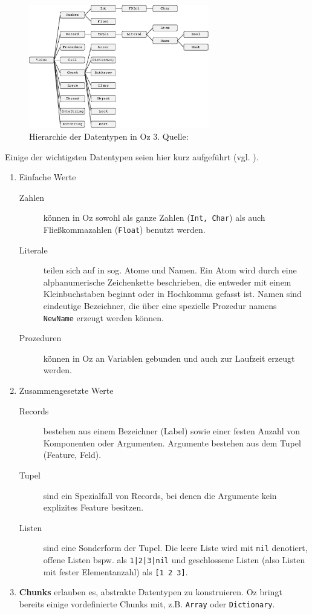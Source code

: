 \begin{figure}[hp]
  \centering \includegraphics[width=0.70\textwidth]{../images/oz-datentypen} 
  \caption{Hierarchie der Datentypen in Oz 3. Quelle:
  \cite[Tutorial of Oz, Chapter 3.1]{url:mozart-documentation}}
  \label{fig:oz-datentypen}
\end{figure}

Einige der wichtigsten Datentypen seien hier kurz aufgeführt (vgl. 
\cite{Brunklaus:00}).

\begin{enumerate}
  \item Einfache Werte
    \begin{description}
      \item [Zahlen] können in Oz sowohl als ganze Zahlen (\texttt{Int, Char})
      als auch Fließkommazahlen (\texttt{Float}) benutzt werden.
      \item[Literale] teilen sich auf in sog. Atome und Namen. Ein Atom wird 
      durch eine alphanumerische Zeichenkette beschrieben, die entweder mit 
      einem Kleinbuchstaben beginnt oder in Hochkomma gefasst ist. Namen sind 
      eindeutige Bezeichner, die über eine spezielle Prozedur namens 
      \texttt{NewName} erzeugt werden können.
      \item[Prozeduren] können in Oz an Variablen gebunden und auch zur 
      Laufzeit erzeugt werden. \end{description}
  \item Zusammengesetzte Werte
    \begin{description}
      \item[Records] bestehen aus einem Bezeichner (Label) sowie einer festen 
      Anzahl von Komponenten oder Argumenten. Argumente bestehen aus dem Tupel 
      (Feature, Feld).
      \item[Tupel] sind ein Spezialfall von Records, bei denen die Argumente 
      kein explizites Feature besitzen.
      \item[Listen] sind eine Sonderform der Tupel. Die leere Liste wird mit
      \texttt{nil} denotiert, offene Listen bspw. als \texttt{1|2|3|nil} und 
      geschlossene Listen (also Listen mit fester Elementanzahl) als \texttt{[1 
      2 3]}.
    \end{description}
  \item \textbf{Chunks} erlauben es, abstrakte Datentypen zu konstruieren. 
  Oz bringt bereits einige vordefinierte Chunks mit, z.B. \texttt{Array} 
  oder \texttt{Dictionary}.
\end{enumerate}

